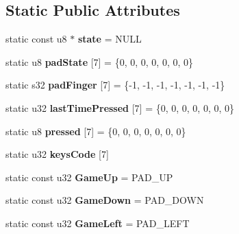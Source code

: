 \subsection*{Static Public Attributes}
\begin{DoxyCompactItemize}
\item 
\hypertarget{classKeyboard_a08007721b0a4fd6e9f7cfe28c70642f7}{static const u8 $\ast$ {\bfseries state} = N\-U\-L\-L}\label{classKeyboard_a08007721b0a4fd6e9f7cfe28c70642f7}

\item 
\hypertarget{classKeyboard_a06624a2a2b9d99013c2a8628e987b616}{static u8 {\bfseries pad\-State} \mbox{[}7\mbox{]} = \{0, 0, 0, 0, 0, 0, 0\}}\label{classKeyboard_a06624a2a2b9d99013c2a8628e987b616}

\item 
\hypertarget{classKeyboard_a9bf5466f6c1ff2e61083f338adada94a}{static s32 {\bfseries pad\-Finger} \mbox{[}7\mbox{]} = \{-\/1, -\/1, -\/1, -\/1, -\/1, -\/1, -\/1\}}\label{classKeyboard_a9bf5466f6c1ff2e61083f338adada94a}

\item 
\hypertarget{classKeyboard_a737a295b7ba6d914fde38f161c86c6eb}{static u32 {\bfseries last\-Time\-Pressed} \mbox{[}7\mbox{]} = \{0, 0, 0, 0, 0, 0, 0\}}\label{classKeyboard_a737a295b7ba6d914fde38f161c86c6eb}

\item 
\hypertarget{classKeyboard_a7be1de7dabf081e6d8a6999976fcce14}{static u8 {\bfseries pressed} \mbox{[}7\mbox{]} = \{0, 0, 0, 0, 0, 0, 0\}}\label{classKeyboard_a7be1de7dabf081e6d8a6999976fcce14}

\item 
static u32 {\bfseries keys\-Code} \mbox{[}7\mbox{]}
\item 
\hypertarget{classKeyboard_aed71247c8acfe01b6ef9199fcb8fb9f7}{static const u32 {\bfseries Game\-Up} = P\-A\-D\-\_\-\-U\-P}\label{classKeyboard_aed71247c8acfe01b6ef9199fcb8fb9f7}

\item 
\hypertarget{classKeyboard_af40e4943fa960c4a09a9e835a32662c0}{static const u32 {\bfseries Game\-Down} = P\-A\-D\-\_\-\-D\-O\-W\-N}\label{classKeyboard_af40e4943fa960c4a09a9e835a32662c0}

\item 
\hypertarget{classKeyboard_a70832e4a44d3d57886fcd9f9946557d2}{static const u32 {\bfseries Game\-Left} = P\-A\-D\-\_\-\-L\-E\-F\-T}\label{classKeyboard_a70832e4a44d3d57886fcd9f9946557d2}


\end{DoxyCompactItemize}
